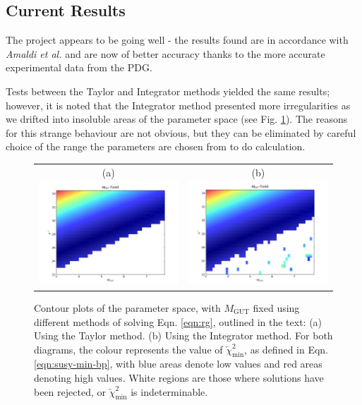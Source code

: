 \documentclass[12pt,a4paper,oneside]{article}
\begin{document}
\subsection{Current Results}
The project appears to be going well - the results found are in accordance with \textit{Amaldi et al.} and are now of better accuracy thanks to the more accurate experimental data from the PDG.

Tests between the Taylor and Integrator methods yielded the same results; however, it is noted that the Integrator method presented more irregularities as we drifted into insoluble areas of the parameter space (see Fig. \ref{fig:psi}). The reasons for this strange behaviour are not obvious, but they can be eliminated by careful choice of the range the parameters are chosen from to do calculation.

\begin{figure}[th]
\begin{center}
\begin{tabular}{cc}
(a) \includegraphics[width=6.75cm]{figs/psi-taylor.png} & (b) \includegraphics[width=6.75cm]{figs/psi-int.png}
\end{tabular}
\caption[]{Contour plots of the parameter space, with $M_\mathrm{GUT}$ fixed using different methods of solving Eqn. \ref{eqn:rg}, outlined in the text: (a) Using the Taylor method. (b) Using the Integrator method. For both diagrams, the colour represents the value of $\overleftarrow{\chi}^2_\mathrm{min}$, as defined in Eqn. \ref{eqn:susy-min-bp}, with blue areas denote low values and red areas denoting high values. White regions are those where solutions have been rejected, or $\overleftarrow{\chi}^2_\mathrm{min}$ is indeterminable.}
\label{fig:psi}
\end{center}
\end{figure}
\end{document}
